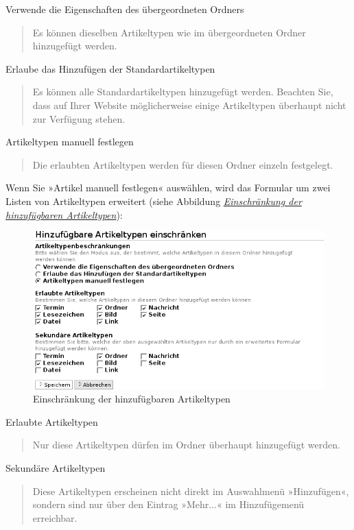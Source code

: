 \documentclass[a4paper,12pt,ngerman]{manual}
\begin{document}
Verwende die Eigenschaften des übergeordneten Ordners
\begin{quote}

Es können dieselben Artikeltypen wie im übergeordneten Ordner hinzugefügt
werden.
\end{quote}

Erlaube das Hinzufügen der Standardartikeltypen
\begin{quote}

Es können alle
Standardartikeltypen hinzugefügt werden. Beachten Sie, dass auf Ihrer
Website möglicherweise einige Artikeltypen überhaupt nicht zur Verfügung
stehen.
\end{quote}

Artikeltypen manuell festlegen
\begin{quote}

Die erlaubten Artikeltypen werden
für diesen Ordner einzeln festgelegt.
\end{quote}

Wenn Sie »Artikel manuell festlegen« auswählen, wird das Formular um zwei
Listen von Artikeltypen erweitert (siehe
Abbildung \hyperlink{fig-hinzufuegen-typen-lang}{\emph{Einschränkung der hinzufügbaren Artikeltypen}}):
\hypertarget{fig-hinzufuegen-typen-lang}{}\begin{figure}[htbp]
\centering

\includegraphics{hinzufuegen-typen-lang.png}
\caption{Einschränkung der hinzufügbaren Artikeltypen}\end{figure}

Erlaubte Artikeltypen
\begin{quote}

Nur diese Artikeltypen dürfen im Ordner überhaupt
hinzugefügt werden.
\end{quote}

Sekundäre Artikeltypen
\begin{quote}

Diese Artikeltypen erscheinen nicht direkt im
Auswahlmenü »Hinzufügen«, sondern sind nur über den Eintrag »Mehr...« im
Hinzufügemenü erreichbar.
\end{quote}
\end{document}
